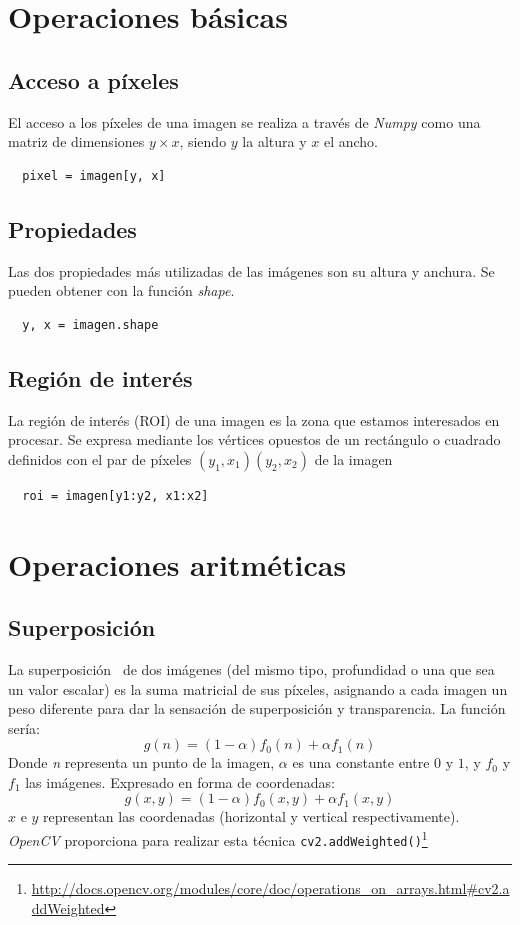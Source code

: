 \section{Operaciones básicas}
\subsection{Acceso a píxeles}
El acceso a los píxeles de una imagen se realiza a través de
\emph{Numpy} como una matriz de dimensiones $y \times x$, siendo $y$
la altura y $x$ el ancho.
\begin{verbatim}
  pixel = imagen[y, x]
\end{verbatim}

\subsection{Propiedades}
Las dos propiedades más utilizadas de las imágenes son su altura y
anchura.  Se pueden obtener con la función \emph{shape}.
\begin{verbatim}
  y, x = imagen.shape
\end{verbatim}

\subsection{Región de interés}\label{tecnica:roi}
La región de interés (ROI) de una imagen es la zona que estamos
interesados en procesar. Se expresa mediante los vértices opuestos de
un rectángulo o cuadrado definidos con el par de píxeles
$\left(y_1,x_1\right)\left(y_2,x_2\right)$ de la imagen
\begin{verbatim}
  roi = imagen[y1:y2, x1:x2]
\end{verbatim}

\section{Operaciones aritméticas}
\subsection{Superposición}
La superposición\emph{~\citep[3.1.1 Pixel transforms, 3.1.3
  Compositing and matting]{szeliski2010computer}} de dos imágenes (del
mismo tipo, profundidad o una que sea un valor escalar) es la suma
matricial de sus píxeles, asignando a cada imagen un peso diferente
para dar la sensación de superposición y transparencia. La función
sería:
\begin{equation*}
  g(n) = (1 - \alpha)f_0(n) + \alpha f_1(n)
\end{equation*}
Donde \emph{n} representa un punto de la imagen, \emph{$\alpha$} es una
constante entre $0$ y $1$, y \emph{$f_0$} y \emph{$f_1$} las imágenes.
Expresado en forma de coordenadas:
\begin{equation*}
  g(x, y) = (1 - \alpha)f_0(x, y) + \alpha f_1(x, y)
\end{equation*}
$x$ e $y$ representan las coordenadas (horizontal y vertical
respectivamente). \emph{OpenCV} proporciona para realizar esta técnica
\texttt{cv2.addWeighted()}\footnote{\url{http://docs.opencv.org/modules/core/doc/operations_on_arrays.html\#cv2.addWeighted}}


